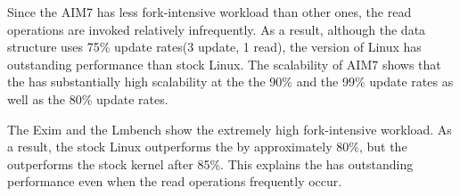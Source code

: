 Since the AIM7 has less fork-intensive workload than other ones, the
read operations are invoked relatively infrequently.
As a result, although the data structure uses 75\% update rates(3 update, 1 read), 
the \LDU version of Linux has outstanding performance than stock Linux.
The scalability of AIM7 shows that the \LDU has substantially high scalability at the
the 90\% and the 99\% update rates as well as the 80\% update rates. 

The Exim and the Lmbench show the extremely high fork-intensive workload.
As a result, the stock Linux outperforms the \LDU by approximately
80\%, but the \LDU outperforms the stock kernel after 85\%.
This explains the \LDU has outstanding performance even when the read operations 
frequently occur.
